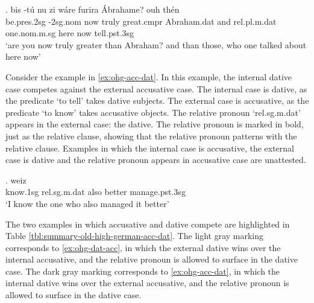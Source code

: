 \exg. bis -tú nu {zi wáre} furira Ábrahame? ouh thén    \\
be.\ac{pres}.2\ac{sg} -2\ac{sg}.\ac{nom} now truly {great}.\ac{cmpr}\scsub{[dat]} Abraham.\ac{dat} and \ac{rel}.\ac{pl}.\ac{m}.\ac{dat} one.\ac{nom}.\ac{m}.\ac{sg} here now tell.\ac{pst}.3\ac{sg}\scsub{[acc]}\\
`are you now truly greater than Abraham? and than those, who one talked about here now' \label{ex:ohg-dat-acc}

Consider the example in \ref{ex:ohg-acc-dat}. In this example, the internal dative case competes against the external accusative case.
The internal case is dative, as the predicate  `to tell' takes dative subjects.
The external case is accusative, as the predicate  `to know' takes accusative objects.
The relative pronoun  `\ac{rel}.\ac{sg}.\ac{m}.\ac{dat}' appears in the external case: the dative. The relative pronoun is marked in bold, just as the relative clause, showing that the relative pronoun patterns with the relative clause.
Examples in which the internal case is accusative, the external case is dative and the relative pronoun appears in accusative case are unattested.

\exg. weiz    \\
know.1\ac{sg}\scsub{[acc]} \ac{rel}.\ac{sg}.\ac{m}.\ac{dat} also better manage.\ac{pst}.3\ac{sg}\scsub{[dat]}\\
`I know the one who also managed it better' \label{ex:ohg-acc-dat}

The two examples in which accusative and dative compete are highlighted in Table \ref{tbl:summary-old-high-german-acc-dat}. The light gray marking corresponds to \ref{ex:ohg-dat-acc}, in which the external dative wins over the internal accusative, and the relative pronoun is allowed to surface in the dative case. The dark gray marking corresponds to \ref{ex:ohg-acc-dat}, in which the internal dative wins over the external accusative, and the relative pronoun is allowed to surface in the dative case.

